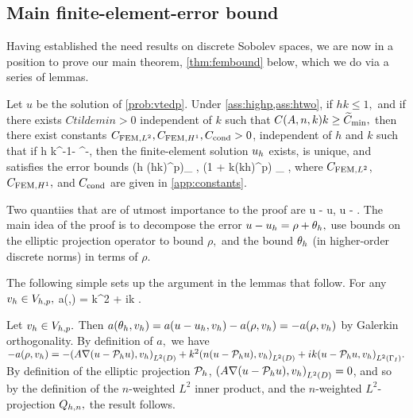 \subsection{Main finite-element-error bound}\label{sec:fembound}

Having established the need results on discrete Sobolev spaces, we are now in a position to prove our main theorem, \cref{thm:fembound} below, which we do via a series of lemmas.

\label{thm:fembound}
Let $u$ be the solution of \cref{prob:vtedp}. Under \cref{ass:highp,ass:htwo}, if $hk \leq 1,$ and if there exists $Ctildemin > 0$ independent of $k$ such that $\CAnk k \geq \Ctildemin,$ then there exist constants $C_{\mathrm{FEM},L^{2}}, C_{\mathrm{FEM},H^{1}}, C_{\mathrm{cond}} > 0$, independent of $h$ and $k$ such that if
\beq\label{eq:hfemcond}
h \leq \Chcond k^{-1-} \CAnk^{-},
\eeq
then the finite-element solution $u_{h}$ exists, is unique, and satisfies the error bounds
\beq\label{eq:femltbound}
 \leq \CFEMLt \mleft(h \CAnk (hk)^{p}\mright)\inf_{\vh \in \Vhp} , \tand
\eeq
\beq
{} \leq \CFEMHo \mleft(1 + \CAnk k(kh)^p\mright) \inf_{\vh \in \Vhp} ,
\eeq\label{eq:femhobound}
where $C_{\mathrm{FEM},L^{2}}$, $C_{\mathrm{FEM},H^{1}},$ and $C_{\mathrm{cond}}$ are given in \cref{app:constants}.
\enth

Two quantiies that are of utmost importance to the proof are
\beqs
\rho \de u - \Ph u, \tand
\eeqs
\beqs
\thetah \de \Ph u - \uh.
\eeqs
The main idea of the proof is to decompose the error $u - u_{h} = \rho + \theta_{h},$ use bounds on the elliptic projection operator to bound $\rho,$ and the bound $\theta_{h}$ (in higher-order discrete norms) in terms of $\rho.$

The following simple  sets up the argument in the lemmas that follow.
\label{lem:simpleform}
For any $v_{h} \in V_{h,p},$
\beq\label{eq:thetaform}
a(\thetah,\vh) = k^2\IPLtDn{\Qhn\rho}{\vh} + ik \IPLtGI{\rho}{\vh}.
\eeq
\ele

Let $v_{h} \in V_{h,p}.$ Then $a(\theta_{h},v_{h}) = a(u-u_{h},v_{h}) - a(\rho,v_{h}) = -a(\rho,v_{h})$ by Galerkin orthogonality. By definition of $a,$ we have $-a(\rho,\vh) = -\IPLtD{A\grad\mleft(u-\Ph u\mright)}{\vh} + k^2 \IPLtD{n\mleft(u-\Ph u\mright)}{\vh} + ik\IPLtGI{u-\Ph u}{\vh}.$ By definition of the elliptic projection $\mathcal P_{h}$, $\IPLtD{A\grad\mleft(u-\Ph u\mright)}{\vh} = 0$, and so by the definition of the $n$-weighted $L^2$ inner product, and the $n$-weighted $L^2$-projection $Q_{h,n},$ the result follows.
\epf

